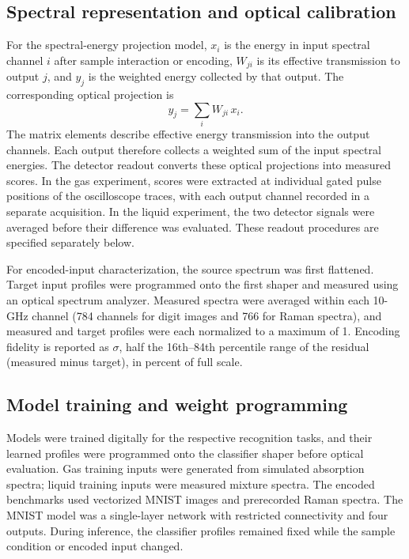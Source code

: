 \documentclass[11pt]{article}
\begin{document}
\subsection*{Spectral representation and optical calibration}
For the spectral-energy projection model, $x_i$ is the energy in input spectral channel $i$ after sample interaction or encoding, $W_{ji}$ is its effective transmission to output $j$, and $y_j$ is the weighted energy collected by that output. The corresponding optical projection is
\begin{equation}
  y_j = \sum_i W_{ji}\, x_i .
  \label{eq:projection}
\end{equation}
The matrix elements describe effective energy transmission into the output channels. Each output therefore collects a weighted sum of the input spectral energies. The detector readout converts these optical projections into measured scores. In the gas experiment, scores were extracted at individual gated pulse positions of the oscilloscope traces, with each output channel recorded in a separate acquisition. In the liquid experiment, the two detector signals were averaged before their difference was evaluated. These readout procedures are specified separately below.

For encoded-input characterization, the source spectrum was first flattened. Target input profiles were programmed onto the first shaper and measured using an optical spectrum analyzer. Measured spectra were averaged within each 10-GHz channel (784 channels for digit images and 766 for Raman spectra), and measured and target profiles were each normalized to a maximum of 1. Encoding fidelity is reported as $\sigma$, half the 16th--84th percentile range of the residual (measured minus target), in percent of full scale.

\subsection*{Model training and weight programming}
Models were trained digitally for the respective recognition tasks, and their learned profiles were programmed onto the classifier shaper before optical evaluation. Gas training inputs were generated from simulated absorption spectra; liquid training inputs were measured mixture spectra. The encoded benchmarks used vectorized MNIST images and prerecorded Raman spectra. The MNIST model was a single-layer network with restricted connectivity and four outputs. During inference, the classifier profiles remained fixed while the sample condition or encoded input changed.
\end{document}
